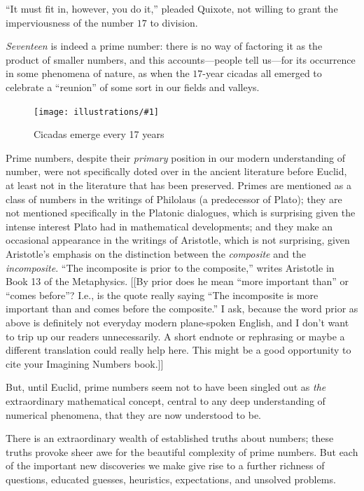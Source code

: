 \documentclass[11pt]{article}
\newcommand{\ill}[3]{ 
   \begin{figure}[H]
   \begin{center}
   \texttt{[image: illustrations/\#1]}
   \caption{#3}
   \end{center}
    \end{figure}
}
\theoremstyle{plain}
\theoremstyle{definition}
\numberwithin{equation}{section}
\numberwithin{figure}{section}
\numberwithin{table}{section}
\begin{document}
``It must fit in, however, you do it,'' pleaded Quixote, not willing to
grant the imperviousness of the number $17$ to division.


\bigskip


{\em Seventeen} is indeed a prime number: there is no way of factoring
it as the product of smaller numbers, and this accounts---people tell
us---for its occurrence in some phenomena of nature, as when
the $17$-year cicadas all emerged to celebrate a ``reunion'' of some
sort in our fields and valleys.

\ill{cicada}{.3}{Cicadas emerge every 17 years}

\bigskip


Prime numbers, despite their {\em primary} position in our modern
understanding of number, were not specifically doted over in the
ancient literature before Euclid, at least not in the literature that
has been preserved. Primes are mentioned as a class of numbers in the
writings of Philolaus (a predecessor of Plato); they are not mentioned
specifically in the Platonic dialogues, which is surprising 
given the intense interest Plato had in mathematical developments; and
they make an occasional appearance in the writings of Aristotle, which
is not surprising, given Aristotle's emphasis on the distinction
between the {\em composite} and the {\em incomposite}. ``The
incomposite is prior to the composite,'' writes Aristotle in Book 13 of
the Metaphysics.
[[By prior does he mean ``more important than'' or ``comes before''?  I.e., is the quote
really saying ``The incomposite is more important than and comes before the composite.''
I ask, because the word prior as above is definitely not everyday modern
plane-spoken English, and I don't want to trip up our readers unnecessarily.  A
short endnote or rephrasing or maybe a different translation could really help here.
This might be a good opportunity to cite your Imagining Numbers book.]]
           
\bigskip


But, until Euclid, prime numbers seem not to have been singled out as
{\em the} extraordinary mathematical concept, central to any deep
understanding of numerical phenomena, that they are now understood to
be.
       
\bigskip


There is an extraordinary wealth of established truths about numbers;
these truths provoke sheer awe for the beautiful complexity of prime
numbers. But each of the important new discoveries we make give rise
to a further richness of questions, educated guesses, heuristics,
expectations, and unsolved problems.
            
\end{document}
